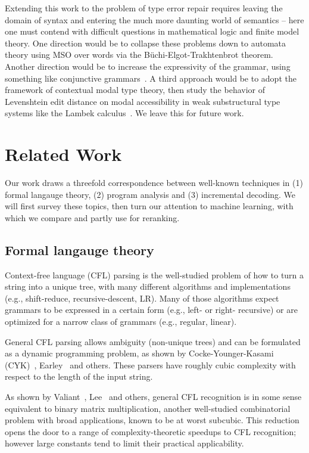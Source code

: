 \documentclass[sigplan,review,acmsmall,nonacm,screen,anonymous]{acmart}\settopmatter{printfolios=false,printccs=false,printacmref=false}
\begin{document}
Extending this work to the problem of type error repair requires leaving the domain of syntax and entering the much more daunting world of semantics -- here one must contend with difficult questions in mathematical logic and finite model theory. One direction would be to collapse these problems down to automata theory using MSO over words via the B\"uchi-Elgot-Trakhtenbrot theorem. Another direction would be to increase the expressivity of the grammar, using something like conjunctive grammars~\cite{okhotin2001conjunctive}. A third approach would be to adopt the framework of contextual modal type theory, then study the behavior of Levenshtein edit distance on modal accessibility in weak substructural type systems like the Lambek calculus~\cite{pshenitsyn2025first}. We leave this for future work.

\clearpage\section{Related Work}\label{sec:related}

Our work draws a threefold correspondence between well-known techniques in (1) formal langauge theory, (2) program analysis and (3) incremental decoding. We will first survey these topics, then turn our attention to machine learning, with which we compare and partly use for reranking.

\subsection{Formal langauge theory}

Context-free language (CFL) parsing is the well-studied problem of how to turn a string into a unique tree, with many different algorithms and implementations (e.g., shift-reduce, recursive-descent, LR). Many of those algorithms expect grammars to be expressed in a certain form (e.g., left- or right- recursive) or are optimized for a narrow class of grammars (e.g., regular, linear).

General CFL parsing allows ambiguity (non-unique trees) and can be formulated as a dynamic programming problem, as shown by Cocke-Younger-Kasami (CYK)~\cite{sakai1961syntax}, Earley~\cite{earley1970efficient} and others. These parsers have roughly cubic complexity with respect to the length of the input string.

As shown by Valiant~\cite{valiant1975general}, Lee~\cite{lee2002fast} and others, general CFL recognition is in some sense equivalent to binary matrix multiplication, another well-studied combinatorial problem with broad applications, known to be at worst subcubic. This reduction opens the door to a range of complexity-theoretic speedups to CFL recognition; however large constants tend to limit their practical applicability.
\end{document}
